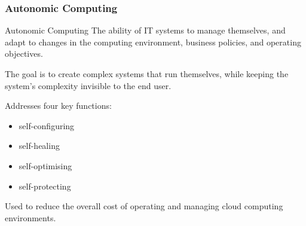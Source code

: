 \documentclass[\main/notes.tex]{subfiles}
\begin{document}
				\subsubsection{Autonomic Computing}
					\begin{definition}{Autonomic Computing}
						The ability of IT systems to manage themselves, and adapt to changes in the computing environment, business policies, and operating objectives.

						The goal is to create complex systems that run themselves, while keeping the system's complexity invisible to the end user.

						Addresses four key functions:
						\begin{multicols}{2}
							\begin{itemize}[nosep]
								\item self-configuring
								\item self-healing
								\item self-optimising
								\item self-protecting
							\end{itemize}
						\end{multicols}
						Used to reduce the overall cost of operating and managing cloud computing environments.
					\end{definition}

	\vbox{}
\end{document}
